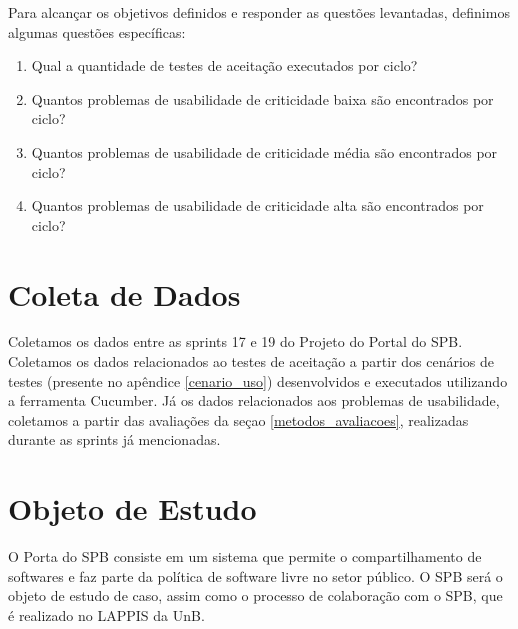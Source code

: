 Para alcançar os objetivos definidos e responder as questões levantadas, definimos algumas questões específicas:

\begin{enumerate}
  \item Qual a quantidade de testes de aceitação executados por ciclo?
  \item Quantos problemas de usabilidade de criticidade baixa são encontrados por ciclo?
  \item Quantos problemas de usabilidade de criticidade média são encontrados por ciclo?
  \item Quantos problemas de usabilidade de criticidade alta são encontrados por ciclo?
\end{enumerate}

\section {Coleta de Dados}

 Coletamos os dados entre as sprints 17 e 19 do Projeto do Portal do SPB. Coletamos os dados relacionados ao testes de aceitação a partir dos cenários de testes (presente no apêndice \ref{cenario_uso}) desenvolvidos e executados utilizando a ferramenta Cucumber. Já os dados relacionados aos problemas de usabilidade, coletamos a partir das avaliações da seçao \ref{metodos_avaliacoes}, realizadas durante as sprints já mencionadas.

\section{Objeto de Estudo}

O Porta do SPB consiste em um sistema que permite o compartilhamento de softwares e faz parte da política de software livre no setor público.
O SPB será o objeto de estudo de caso, assim como o processo de colaboração com o SPB, que é realizado no LAPPIS da UnB.

